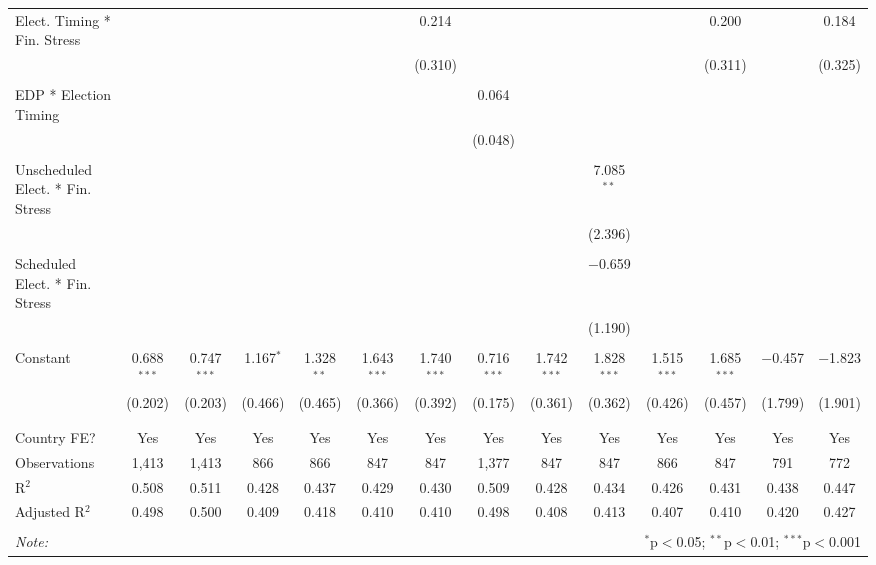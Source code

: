 \begin{table}[!htbp]
\begin{tabular}{@{\extracolsep{5pt}}lccccccccccccc}
 Elect. Timing * Fin. Stress &  &  &  &  &  & 0.214 &  &  &  &  & 0.200 &  & 0.184 \\ 
  &  &  &  &  &  & (0.310) &  &  &  &  & (0.311) &  & (0.325) \\ 
  & & & & & & & & & & & & & \\ 
 EDP * Election Timing &  &  &  &  &  &  & 0.064 &  &  &  &  &  &  \\ 
  &  &  &  &  &  &  & (0.048) &  &  &  &  &  &  \\ 
  & & & & & & & & & & & & & \\ 
 Unscheduled Elect. * Fin. Stress &  &  &  &  &  &  &  &  & 7.085$^{**}$ &  &  &  &  \\ 
  &  &  &  &  &  &  &  &  & (2.396) &  &  &  &  \\ 
  & & & & & & & & & & & & & \\ 
 Scheduled Elect. * Fin. Stress &  &  &  &  &  &  &  &  & $-$0.659 &  &  &  &  \\ 
  &  &  &  &  &  &  &  &  & (1.190) &  &  &  &  \\ 
  & & & & & & & & & & & & & \\ 
 Constant & 0.688$^{***}$ & 0.747$^{***}$ & 1.167$^{*}$ & 1.328$^{**}$ & 1.643$^{***}$ & 1.740$^{***}$ & 0.716$^{***}$ & 1.742$^{***}$ & 1.828$^{***}$ & 1.515$^{***}$ & 1.685$^{***}$ & $-$0.457 & $-$1.823 \\ 
  & (0.202) & (0.203) & (0.466) & (0.465) & (0.366) & (0.392) & (0.175) & (0.361) & (0.362) & (0.426) & (0.457) & (1.799) & (1.901) \\ 
  & & & & & & & & & & & & & \\ 
\hline \\[-1.8ex] 
Country FE? & Yes & Yes & Yes & Yes & Yes & Yes & Yes & Yes & Yes & Yes & Yes & Yes & Yes \\ 
Observations & 1,413 & 1,413 & 866 & 866 & 847 & 847 & 1,377 & 847 & 847 & 866 & 847 & 791 & 772 \\ 
R$^{2}$ & 0.508 & 0.511 & 0.428 & 0.437 & 0.429 & 0.430 & 0.509 & 0.428 & 0.434 & 0.426 & 0.431 & 0.438 & 0.447 \\ 
Adjusted R$^{2}$ & 0.498 & 0.500 & 0.409 & 0.418 & 0.410 & 0.410 & 0.498 & 0.408 & 0.413 & 0.407 & 0.410 & 0.420 & 0.427 \\ 
\hline 
\hline \\[-1.8ex] 
\textit{Note:}  & \multicolumn{13}{r}{$^{*}$p$<$0.05; $^{**}$p$<$0.01; $^{***}$p$<$0.001} \\ 
\end{tabular} 
\end{table} 
